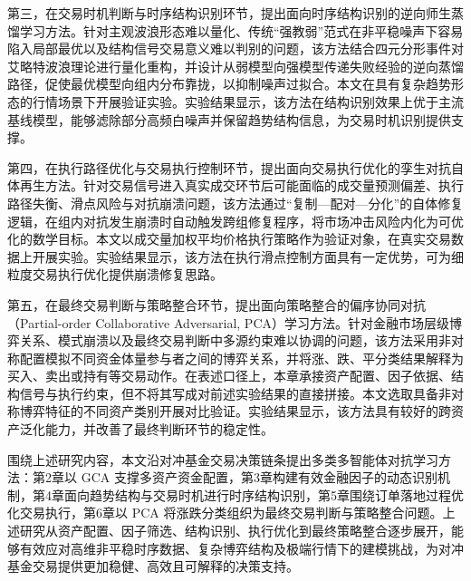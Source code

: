 \begin{cabstract}
第三，在交易时机判断与时序结构识别环节，提出面向时序结构识别的逆向师生蒸馏学习方法。针对主观波浪形态难以量化、传统“强教弱”范式在非平稳噪声下容易陷入局部最优以及结构信号交易意义难以判别的问题，该方法结合四元分形事件对艾略特波浪理论进行量化重构，并设计从弱模型向强模型传递失败经验的逆向蒸馏路径，促使最优模型向组内分布靠拢，以抑制噪声过拟合。本文在具有复杂趋势形态的行情场景下开展验证实验。实验结果显示，该方法在结构识别效果上优于主流基线模型，能够滤除部分高频白噪声并保留趋势结构信息，为交易时机识别提供支撑。

第四，在执行路径优化与交易执行控制环节，提出面向交易执行优化的孪生对抗自体再生方法。针对交易信号进入真实成交环节后可能面临的成交量预测偏差、执行路径失衡、滑点风险与对抗崩溃问题，该方法通过“复制—配对—分化”的自体修复逻辑，在组内对抗发生崩溃时自动触发跨组修复程序，将市场冲击风险内化为可优化的数学目标。本文以成交量加权平均价格执行策略作为验证对象，在真实交易数据上开展实验。实验结果显示，该方法在执行滑点控制方面具有一定优势，可为细粒度交易执行优化提供崩溃修复思路。

第五，在最终交易判断与策略整合环节，提出面向策略整合的偏序协同对抗（Partial-order Collaborative Adversarial, PCA）学习方法。针对金融市场层级博弈关系、模式崩溃以及最终交易判断中多源约束难以协调的问题，该方法采用非对称配置模拟不同资金体量参与者之间的博弈关系，并将涨、跌、平分类结果解释为买入、卖出或持有等交易动作。在表述口径上，本章承接资产配置、因子依据、结构信号与执行约束，但不将其写成对前述实验结果的直接拼接。本文选取具备非对称博弈特征的不同资产类别开展对比验证。实验结果显示，该方法具有较好的跨资产泛化能力，并改善了最终判断环节的稳定性。

围绕上述研究内容，本文沿对冲基金交易决策链条提出多类多智能体对抗学习方法：第2章以 GCA 支撑多资产资金配置，第3章构建有效金融因子的动态识别机制，第4章面向趋势结构与交易时机进行时序结构识别，第5章围绕订单落地过程优化交易执行，第6章以 PCA 将涨跌分类组织为最终交易判断与策略整合问题。上述研究从资产配置、因子筛选、结构识别、执行优化到最终策略整合逐步展开，能够有效应对高维非平稳时序数据、复杂博弈结构及极端行情下的建模挑战，为对冲基金交易提供更加稳健、高效且可解释的决策支持。
\end{cabstract}

